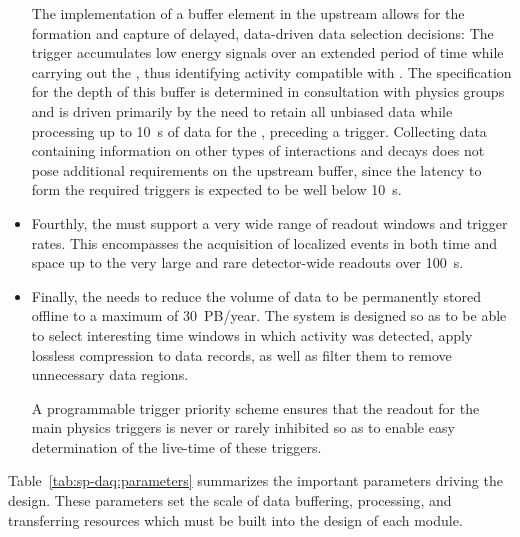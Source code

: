 \begin{itemize}
  The implementation of a buffer element in the upstream  allows
  for the formation and capture of delayed, data-driven data selection
  decisions:
  The trigger accumulates low energy signals over an extended period
  of time while carrying out the , thus identifying activity compatible with .
  The specification for the depth of this buffer is determined in
  consultation with physics groups and is driven primarily by the need
  to retain all unbiased data while processing up to \SI{10}{s} of
  data for the , preceding a  trigger.
  Collecting data containing information on other types of interactions and decays does not pose additional requirements on the upstream  buffer, since the latency to form the required triggers is expected to be well below \SI{10}{s}.

\item Fourthly, the  must support a very wide range of readout windows and trigger rates. This encompasses the acquisition of localized events in both time and space up to the very large and rare  detector-wide readouts over \SI{100}{s}.

\item Finally, the  needs to reduce the volume of data to be permanently stored offline to a maximum of \SI{30}{PB/year}.
  The  system is designed so as to be able to select interesting time windows in which activity was detected, apply lossless compression to data records, as well as filter them to remove unnecessary data regions.

A programmable trigger priority scheme ensures that the readout for the main physics triggers is never or rarely inhibited so as to enable easy determination of the live-time of these triggers. 


\end{itemize}

Table~\ref{tab:sp-daq:parameters} summarizes the important parameters driving the  design. These parameters set the scale of data buffering, processing, and transferring resources which must be built into the design of each  module. 

